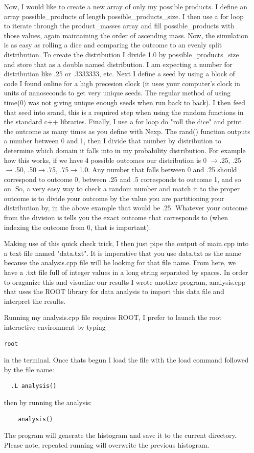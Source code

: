 \documentclass[11pt]{article}
\begin{document}
Now, I would like to create a new array of only my possible products. I define an array possible\_products of length possible\_products\_size. I then use a for loop to iterate through the product\_masses array and fill possible\_products with those values, again maintaining the order of ascending mass. Now, the simulation is as easy as rolling a dice and comparing the outcome to an evenly split distribution. To create the distribution I divide 1.0 by possible\_products\_size and store that as a double named distribution. I am expecting a number for distribution like .25 or .3333333, etc. Next I define a seed by using a block of code I found online for a high precesion clock (it uses your computer's clock in units of nanoseconds to get very unique seeds. The regular method of using time(0) was not giving unique enough seeds when run back to back). I then feed that seed into srand, this is a required step when using the random functions in the standard c++ libraries. Finally, I use a for loop do "roll the dice" and print the outcome as many times as you define with Nexp. The rand() function outputs a number between 0 and 1, then I divide that number by distribution to determine which domain it falls into in my probability distribution. For example how this works, if we have 4 possible outcomes our distribution is 0 $\rightarrow$.25, .25$\rightarrow$.50, .50$\rightarrow$.75, .75$\rightarrow$1.0. Any number that falls between 0 and .25 should correspond to outcome 0, between .25 and .5 corresponds to outcome 1, and so on. So, a very easy way to check a random number and match it to the proper outcome is to divide your outcome by the value you are partitioning your distribution by, in the above example that would be .25. Whatever your outcome from the division is tells you the exact outcome that corresponds to (when indexing the outcome from 0, that is important). 

Making use of this quick check trick, I then just pipe the output of main.cpp into a text file named "data.txt". It is imperative that you use data.txt as the name because the analysis.cpp file will be looking for that file name. From here, we have a .txt file full of integer values in a long string separated by spaces. In order to oraganize this and visualize our results I wrote another program, analysis.cpp that uses the ROOT library for data analysis to import this data file and interpret the results. 

Running my analysis.cpp file requires ROOT, I prefer to launch the root interactive environment by typing \begin{verbatim}
root
  \end{verbatim}
   in the terminal. Once thats begun I load the file with the load command followed by the file name: \begin{verbatim}
  .L analysis()
  \end{verbatim}
  then by running the analysis: 
  \begin{verbatim}
    analysis()
    \end{verbatim}
    The program will generate the histogram and save it to the current directory. Please note, repeated running will overwrite the previous histogram.
\end{document}
